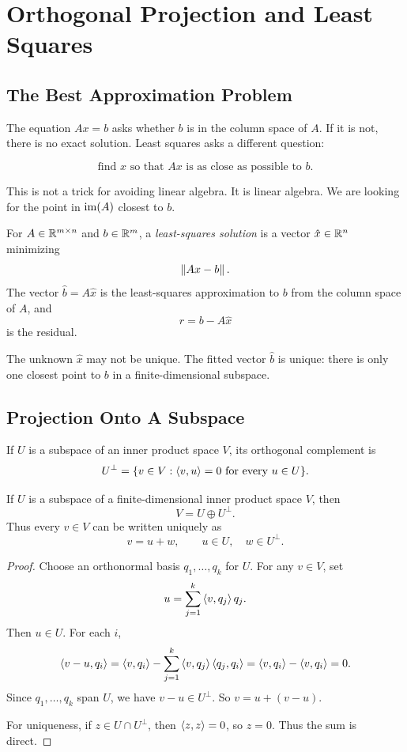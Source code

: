 \chapter{Orthogonal Projection and Least Squares}
\label{ch:projection-least-squares}

\section{The Best Approximation Problem}

The equation $Ax=b$ asks whether $b$ is in the column space of $A$. If it is
not, there is no exact solution. Least squares asks a different question:

\[
  \text{find }x\text{ so that }Ax\text{ is as close as possible to }b.
\]

This is not a trick for avoiding linear algebra. It is linear algebra. We are
looking for the point in $\operatorname{im}(A)$ closest to $b$.

\begin{definition}
For $A \in \mathbb{R}^{m \times n}$ and $b \in \mathbb{R}^m$, a \emph{least-squares solution}
is a vector $\hat{x}\in\mathbb{R}^n$ minimizing
\[
  \left\lVert Ax-b \right\rVert.
\]
The vector $\hat{b}=A\hat{x}$ is the least-squares approximation to $b$ from
the column space of $A$, and
\[
  r=b-A\hat{x}
\]
is the residual.
\end{definition}

The unknown $\hat{x}$ may not be unique. The fitted vector $\hat{b}$ is unique:
there is only one closest point to $b$ in a finite-dimensional subspace.

\section{Projection Onto A Subspace}

\begin{definition}
If $U$ is a subspace of an inner product space $V$, its orthogonal complement is
\[
  U^\perp=\{v\in V:\left\langle v,u \right\rangle=0\text{ for every }u\in U\}.
\]
\end{definition}

\begin{proposition}
If $U$ is a subspace of a finite-dimensional inner product space $V$, then
\[
  V = U \oplus U^\perp.
\]
Thus every $v\in V$ can be written uniquely as
\[
  v=u+w,\qquad u\in U,\quad w\in U^\perp.
\]
\end{proposition}

\begin{proof}
Choose an orthonormal basis $q_1,\ldots,q_k$ for $U$. For any $v\in V$, set
\[
  u=\sum_{j=1}^k \left\langle v,q_j \right\rangle q_j.
\]
Then $u\in U$. For each $i$,
\[
  \left\langle v-u,q_i \right\rangle
  =
  \left\langle v,q_i \right\rangle
  -
  \sum_{j=1}^k \left\langle v,q_j \right\rangle\left\langle q_j,q_i \right\rangle
  =
  \left\langle v,q_i \right\rangle-\left\langle v,q_i \right\rangle
  =
  0.
\]
Since $q_1,\ldots,q_k$ span $U$, we have $v-u\in U^\perp$. So
$v=u+(v-u)$.

For uniqueness, if $z\in U\cap U^\perp$, then $\left\langle z,z \right\rangle=0$, so $z=0$.
Thus the sum is direct.
\end{proof}

